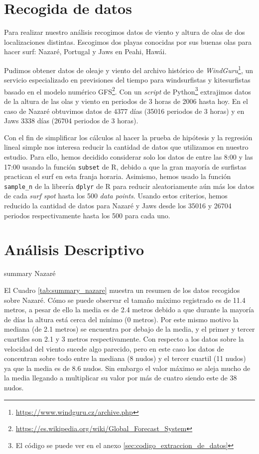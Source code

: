 \section{Recogida de datos}%
\label{sec:recogida_de_datos}
Para realizar nuestro análisis recogimos datos de viento y altura de olas de
dos localizaciones distintas. Escogimos dos playas conocidas por sus buenas
olas para hacer surf: Nazaré, Portugal y Jaws en Peahi, Hawái.

Pudimos obtener datos de oleaje y viento del archivo histórico de \emph{WindGuru}\footnote{\url{https://www.windguru.cz/archive.php}}, un servicio especializado en previsiones del tiempo para windsurfistas y kitesurfistas basado en el modelo numérico GFS\footnote{\url{https://es.wikipedia.org/wiki/Global_Forecast_System}}. Con un \textit{script} de
Python\footnote{El código se puede ver en el anexo
  \ref{sec:codigo_extraccion_de_datos}} extrajimos datos de la altura de las
olas y viento en periodos de 3 horas de 2006 hasta hoy. En el caso de Nazaré
obtuvimos datos de 4377 días (35016 periodos de 3 horas) y en Jaws 3338 días
(26704 periodos de 3 horas).

Con el fin de simplificar los cálculos al hacer la prueba de hipótesis y la regresión lineal simple nos interesa reducir la cantidad de datos que utilizamos en nuestro estudio. Para ello, hemos decidido considerar solo los datos de entre las 8:00 y las 17:00 usando la función \texttt{subset} de R, debido a que la gran mayoría de surfistas practican el surf en esta franja horaria. Asimismo, hemos usado la función \texttt{sample\_n} de la librería \texttt{dplyr} de R para reducir aleatoriamente aún más los datos de cada \textit{surf spot} hasta los 500 \textit{data points}. Usando estos criterios, hemos reducido la cantidad de datos para Nazaré y Jaws desde los 35016 y 26704 periodos respectivamente hasta los 500 para cada uno.

\section{Análisis Descriptivo}%
\label{sec:metodos}

\begin{table}[htbp]
\centering

\caption{summary Nazaré}
\label{tab:summary_nazare}
\end{table}

El Cuadro \ref{tab:summary_nazare} muestra un resumen de los datos recogidos sobre Nazaré. Cómo se puede observar el tamaño máximo registrado es de 11.4 metros, a pesar de ello la media es de 2.4 metros debido a que durante la mayoría de días la altura está cerca del mínimo (0 metros). Por este mismo motivo la mediana (de 2.1 metros) se encuentra por debajo de la media, y el primer y tercer cuartiles son 2.1 y 3 metros respectivamente.
Con respecto a los datos sobre la velocidad del viento sucede algo parecido, pero en este caso los datos de concentran sobre todo entre la mediana (8 nudos) y el tercer cuartil (11 nudos) ya que la media es de 8.6 nudos. Sin embargo el valor máximo se aleja mucho de la media llegando a multiplicar su valor por más de cuatro siendo este de 38 nudos.


